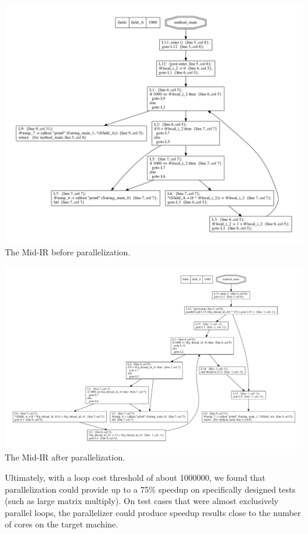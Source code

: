 \documentclass[11pt]{article}
\begin{document}
\begin{center}
\includegraphics[width=500px]{graphs/before_parallel}\\
The Mid-IR before parallelization.
\end{center}

\begin{center}
\includegraphics[width=500px]{graphs/after_parallel}\\
The Mid-IR after parallelization. 
\end{center}

Ultimately, with a loop cost threshold of about 1000000, we found
that parallelization could provide up to a 75\% speedup on
specifically designed tests (such as large matrix multiply). On test cases
that were almost exclusively parallel loops, the parallelizer could
produce speedup results close to the number of cores on the target
machine. 
\end{document}
